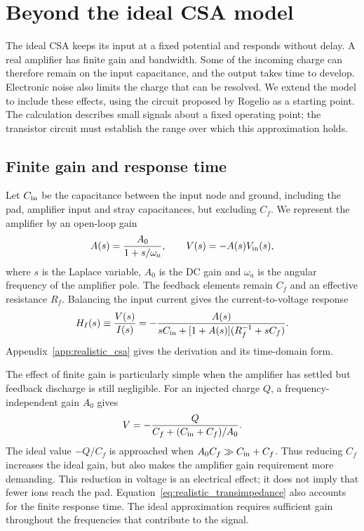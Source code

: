\section{Beyond the ideal CSA model}
\label{sec:realistic_csa}

The ideal CSA keeps its input at a fixed potential and responds without delay. A real amplifier has finite gain and bandwidth. Some of the incoming charge can therefore remain on the input capacitance, and the output takes time to develop. Electronic noise also limits the charge that can be resolved. We extend the model to include these effects, using the circuit proposed by Rogelio as a starting point. The calculation describes small signals about a fixed operating point; the transistor circuit must establish the range over which this approximation holds.

\subsection{Finite gain and response time}

Let $C_{\rm in}$ be the capacitance between the input node and ground, including the pad, amplifier input and stray capacitances, but excluding $C_f$. We represent the amplifier by an open-loop gain
\begin{equation}
 A(s)=\frac{A_0}{1+s/\omega_a},\qquad V(s)=-A(s)V_{\rm in}(s),
 \label{eq:realistic_gain}
\end{equation}
where $s$ is the Laplace variable, $A_0$ is the DC gain and $\omega_a$ is the angular frequency of the amplifier pole. The feedback elements remain $C_f$ and an effective resistance $R_f$. Balancing the input current gives the current-to-voltage response
\begin{equation}
 H_I(s)\equiv\frac{V(s)}{I(s)}
 =-\frac{A(s)}{sC_{\rm in}+[1+A(s)](R_f^{-1}+sC_f)}.
 \label{eq:realistic_transimpedance}
\end{equation}
Appendix~\ref{app:realistic_csa} gives the derivation and its time-domain form.

The effect of finite gain is particularly simple when the amplifier has settled but feedback discharge is still negligible. For an injected charge $Q$, a frequency-independent gain $A_0$ gives
\begin{equation}
 V=-\frac{Q}{C_f+(C_{\rm in}+C_f)/A_0}.
 \label{eq:realistic_charge_gain}
\end{equation}
The ideal value $-Q/C_f$ is approached when $A_0C_f\gg C_{\rm in}+C_f$. Thus reducing $C_f$ increases the ideal gain, but also makes the amplifier gain requirement more demanding. This reduction in voltage is an electrical effect; it does not imply that fewer ions reach the pad. Equation~\eqref{eq:realistic_transimpedance} also accounts for the finite response time. The ideal approximation requires sufficient gain throughout the frequencies that contribute to the signal.

